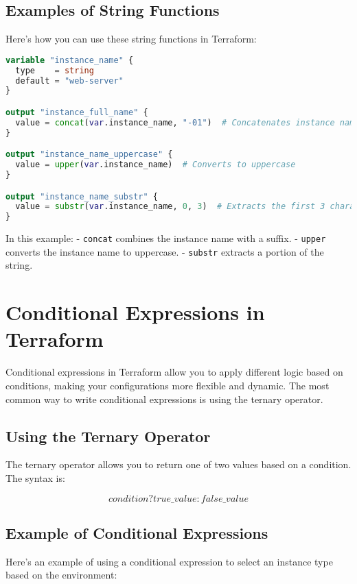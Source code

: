 \subsection{Examples of String Functions}

Here's how you can use these string functions in Terraform:

\begin{lstlisting}[language=terraform]
variable "instance_name" {
  type    = string
  default = "web-server"
}

output "instance_full_name" {
  value = concat(var.instance_name, "-01")  # Concatenates instance name with a number
}

output "instance_name_uppercase" {
  value = upper(var.instance_name)  # Converts to uppercase
}

output "instance_name_substr" {
  value = substr(var.instance_name, 0, 3)  # Extracts the first 3 characters
}
\end{lstlisting}

In this example:
- \texttt{concat} combines the instance name with a suffix.
- \texttt{upper} converts the instance name to uppercase.
- \texttt{substr} extracts a portion of the string.

\section{Conditional Expressions in Terraform}

Conditional expressions in Terraform allow you to apply different logic based on conditions, making your configurations more flexible and dynamic. The most common way to write conditional expressions is using the ternary operator.

\subsection{Using the Ternary Operator}

The ternary operator allows you to return one of two values based on a condition. The syntax is:

\[
condition ? true\_value : false\_value
\]

\subsection{Example of Conditional Expressions}

Here's an example of using a conditional expression to select an instance type based on the environment:

